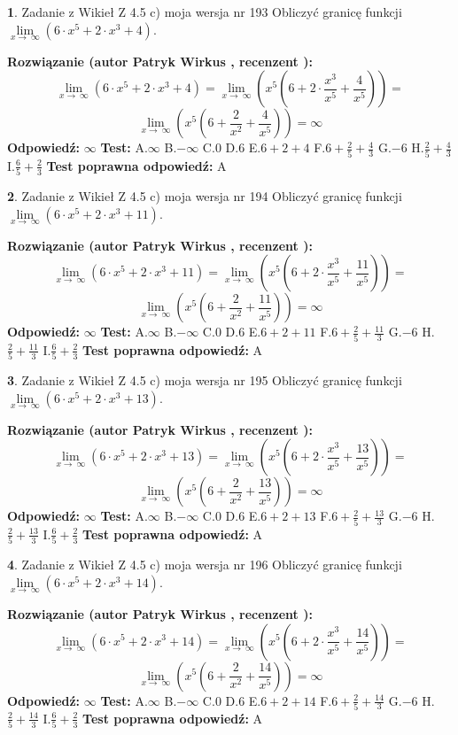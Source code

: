 \documentclass[12pt, a4paper]{article}
\theoremstyle{definition} %
\newtheorem{zad}{}
\newcommand{\zadStart}[1]{\begin{zad}#1\newline}
\newcommand{\zadStop}{\end{zad}}
\newcommand{\rozwStart}[2]{\noindent \textbf{Rozwiązanie (autor #1 , recenzent #2): }\newline}
\newcommand{\rozwStop}{\newline}
\newcommand{\odpStart}{\noindent \textbf{Odpowiedź:}\newline}
\newcommand{\odpStop}{\newline}
\newcommand{\testStart}{\noindent \textbf{Test:}\newline}
\newcommand{\testStop}{\newline}
\newcommand{\kluczStart}{\noindent \textbf{Test poprawna odpowiedź:}\newline}
\newcommand{\kluczStop}{\newline}
\begin{document}
\zadStart{Zadanie z Wikieł Z 4.5 c) moja wersja nr 193}
Obliczyć granicę funkcji  $\lim\limits_{x\to\ \infty}(6 \cdot x^{5}+2 \cdot x^{3}+4)$.
\zadStop
\rozwStart{Patryk Wirkus}{}
$$\lim\limits_{x\to\ \infty}(6 \cdot x^{5}+2 \cdot x^{3}+4) = \lim\limits_{x\to\ \infty}(x^{5}(6 +2 \cdot \frac{x^{3}}{x^{5}}+\frac{4}{x^{5}})) =$$ $$\lim\limits_{x\to\ \infty}(x^{5}(6 +\frac{2}{x^{2}}+\frac{4}{x^{5}})) =\infty$$
\rozwStop
\odpStart
$\infty$
\odpStop
\testStart
A.$\infty$ B.$-\infty$ C.$0$ D.$6$ E.$6 + 2 + 4$
F.$6+\frac{2}{5}+\frac{4}{3}$ G.$-6$
H.$\frac{2}{5}+\frac{4}{3}$
I.$\frac{6}{5}+\frac{2}{3}$
\testStop
\kluczStart
A
\kluczStop



\zadStart{Zadanie z Wikieł Z 4.5 c) moja wersja nr 194}
Obliczyć granicę funkcji  $\lim\limits_{x\to\ \infty}(6 \cdot x^{5}+2 \cdot x^{3}+11)$.
\zadStop
\rozwStart{Patryk Wirkus}{}
$$\lim\limits_{x\to\ \infty}(6 \cdot x^{5}+2 \cdot x^{3}+11) = \lim\limits_{x\to\ \infty}(x^{5}(6 +2 \cdot \frac{x^{3}}{x^{5}}+\frac{11}{x^{5}})) =$$ $$\lim\limits_{x\to\ \infty}(x^{5}(6 +\frac{2}{x^{2}}+\frac{11}{x^{5}})) =\infty$$
\rozwStop
\odpStart
$\infty$
\odpStop
\testStart
A.$\infty$ B.$-\infty$ C.$0$ D.$6$ E.$6 + 2 + 11$
F.$6+\frac{2}{5}+\frac{11}{3}$ G.$-6$
H.$\frac{2}{5}+\frac{11}{3}$
I.$\frac{6}{5}+\frac{2}{3}$
\testStop
\kluczStart
A
\kluczStop



\zadStart{Zadanie z Wikieł Z 4.5 c) moja wersja nr 195}
Obliczyć granicę funkcji  $\lim\limits_{x\to\ \infty}(6 \cdot x^{5}+2 \cdot x^{3}+13)$.
\zadStop
\rozwStart{Patryk Wirkus}{}
$$\lim\limits_{x\to\ \infty}(6 \cdot x^{5}+2 \cdot x^{3}+13) = \lim\limits_{x\to\ \infty}(x^{5}(6 +2 \cdot \frac{x^{3}}{x^{5}}+\frac{13}{x^{5}})) =$$ $$\lim\limits_{x\to\ \infty}(x^{5}(6 +\frac{2}{x^{2}}+\frac{13}{x^{5}})) =\infty$$
\rozwStop
\odpStart
$\infty$
\odpStop
\testStart
A.$\infty$ B.$-\infty$ C.$0$ D.$6$ E.$6 + 2 + 13$
F.$6+\frac{2}{5}+\frac{13}{3}$ G.$-6$
H.$\frac{2}{5}+\frac{13}{3}$
I.$\frac{6}{5}+\frac{2}{3}$
\testStop
\kluczStart
A
\kluczStop



\zadStart{Zadanie z Wikieł Z 4.5 c) moja wersja nr 196}
Obliczyć granicę funkcji  $\lim\limits_{x\to\ \infty}(6 \cdot x^{5}+2 \cdot x^{3}+14)$.
\zadStop
\rozwStart{Patryk Wirkus}{}
$$\lim\limits_{x\to\ \infty}(6 \cdot x^{5}+2 \cdot x^{3}+14) = \lim\limits_{x\to\ \infty}(x^{5}(6 +2 \cdot \frac{x^{3}}{x^{5}}+\frac{14}{x^{5}})) =$$ $$\lim\limits_{x\to\ \infty}(x^{5}(6 +\frac{2}{x^{2}}+\frac{14}{x^{5}})) =\infty$$
\rozwStop
\odpStart
$\infty$
\odpStop
\testStart
A.$\infty$ B.$-\infty$ C.$0$ D.$6$ E.$6 + 2 + 14$
F.$6+\frac{2}{5}+\frac{14}{3}$ G.$-6$
H.$\frac{2}{5}+\frac{14}{3}$
I.$\frac{6}{5}+\frac{2}{3}$
\testStop
\kluczStart
A
\kluczStop
\end{document}
